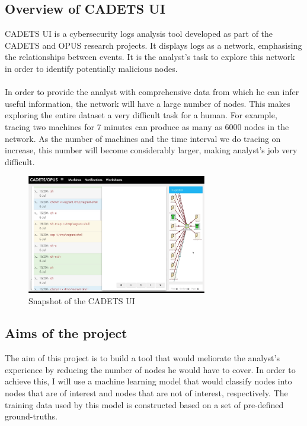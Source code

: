 \documentclass[12pt,a4paper,twoside,openright]{report}
\begin{document}
\subsection{Overview of CADETS UI}\label{1.1.1}
CADETS UI is a cybersecurity logs analysis tool developed as part of the CADETS and OPUS research projects. It displays logs as a network, emphasising the relationships between events. It is the analyst's task to explore this network in order to identify potentially malicious nodes.
\\ \\
In order to provide the analyst with comprehensive data from which he can infer useful information, the network will have a large number of nodes. This makes exploring the entire dataset a very difficult task for a human.  For example, tracing two machines for 7 minutes can produce as many as 6000 nodes in the network.  As the number of machines and the time interval we do tracing on increase, this number will become considerably larger, making analyst's job very difficult. 
\begin{figure}[t!]
	\caption{Snapshot of the CADETS UI}
	\centering
	\includegraphics[width=0.7\textwidth]{graphics/CADETS}
\end{figure}

\newpage

\subsection{Aims of the project}
The aim of this project is to build a tool that would meliorate the analyst's experience by reducing the number of nodes he would have to cover. In order to achieve this, I will use a machine learning model that would classify nodes into nodes that are of interest and nodes that are not of interest, respectively. The training data used by this model is constructed based on a set of pre-defined ground-truths. 
\end{document}

